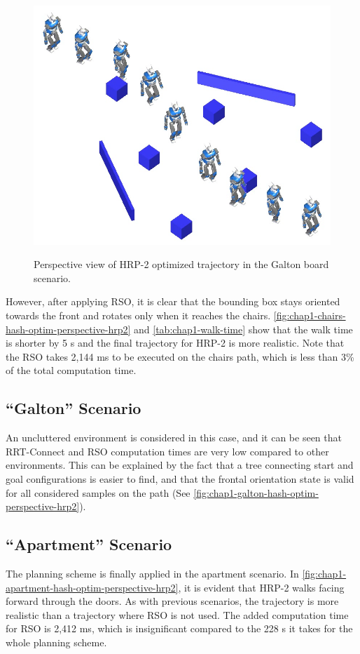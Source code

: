\begin{figure}
  \centering
      {\includegraphics[width = \linewidth]
        {src/chap1-path-optimization/galton-hash-optim-perspective-hrp2.png}}
      \caption{Perspective view of HRP-2 optimized trajectory in the
        Galton board scenario.}
      \label{fig:chap1-galton-hash-optim-perspective-hrp2}
\end{figure}

However, after applying RSO, it is clear that the bounding box stays
oriented towards the front and rotates only when it reaches the
chairs. \autoref{fig:chap1-chairs-hash-optim-perspective-hrp2} and
\autoref{tab:chap1-walk-time} show that the walk time is shorter by 5
s and the final trajectory for HRP-2 is more realistic. Note that the
RSO takes 2,144 ms to be executed on the chairs path, which is less
than 3\% of the total computation time.

\subsection{``Galton'' Scenario}
An uncluttered environment is considered in this case, and
it can be seen that RRT-Connect and RSO computation times are very low
compared to other environments. This can be explained by the fact that
a tree connecting start and goal configurations is easier to find, and
that the frontal orientation state is valid for all considered samples
on the path (See \autoref{fig:chap1-galton-hash-optim-perspective-hrp2}).

\subsection{``Apartment'' Scenario}
The planning scheme is finally applied in the apartment scenario. In
\autoref{fig:chap1-apartment-hash-optim-perspective-hrp2}, it is
evident that HRP-2 walks facing forward through the doors. As with
previous scenarios, the trajectory is more realistic than a trajectory
where RSO is not used. The added computation time for RSO is 2,412 ms,
which is insignificant compared to the 228 s it takes for the whole
planning scheme.

